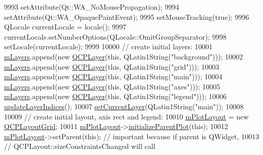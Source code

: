 \begin{DoxyCode}
9993   setAttribute(Qt::WA\_NoMousePropagation);
9994   setAttribute(Qt::WA\_OpaquePaintEvent);
9995   setMouseTracking(\textcolor{keyword}{true});
9996   QLocale currentLocale = locale();
9997   currentLocale.setNumberOptions(QLocale::OmitGroupSeparator);
9998   setLocale(currentLocale);
9999 
10000   \textcolor{comment}{// create initial layers:}
10001   \hyperlink{class_q_custom_plot_a9685e7ec1ef5e6066dd7d91bb3a698b3}{mLayers}.append(\textcolor{keyword}{new} \hyperlink{class_q_custom_plot_a5dbf96bf7664c1b6fce49063eeea6eef}{QCPLayer}(\textcolor{keyword}{this}, QLatin1String(\textcolor{stringliteral}{"background"})));
10002   \hyperlink{class_q_custom_plot_a9685e7ec1ef5e6066dd7d91bb3a698b3}{mLayers}.append(\textcolor{keyword}{new} \hyperlink{class_q_custom_plot_a5dbf96bf7664c1b6fce49063eeea6eef}{QCPLayer}(\textcolor{keyword}{this}, QLatin1String(\textcolor{stringliteral}{"grid"})));
10003   \hyperlink{class_q_custom_plot_a9685e7ec1ef5e6066dd7d91bb3a698b3}{mLayers}.append(\textcolor{keyword}{new} \hyperlink{class_q_custom_plot_a5dbf96bf7664c1b6fce49063eeea6eef}{QCPLayer}(\textcolor{keyword}{this}, QLatin1String(\textcolor{stringliteral}{"main"})));
10004   \hyperlink{class_q_custom_plot_a9685e7ec1ef5e6066dd7d91bb3a698b3}{mLayers}.append(\textcolor{keyword}{new} \hyperlink{class_q_custom_plot_a5dbf96bf7664c1b6fce49063eeea6eef}{QCPLayer}(\textcolor{keyword}{this}, QLatin1String(\textcolor{stringliteral}{"axes"})));
10005   \hyperlink{class_q_custom_plot_a9685e7ec1ef5e6066dd7d91bb3a698b3}{mLayers}.append(\textcolor{keyword}{new} \hyperlink{class_q_custom_plot_a5dbf96bf7664c1b6fce49063eeea6eef}{QCPLayer}(\textcolor{keyword}{this}, QLatin1String(\textcolor{stringliteral}{"legend"})));
10006   \hyperlink{class_q_custom_plot_a3117754df3a5638787a6223c7147970f}{updateLayerIndices}();
10007   \hyperlink{class_q_custom_plot_a73a6dc47c653bb6f8f030abca5a11852}{setCurrentLayer}(QLatin1String(\textcolor{stringliteral}{"main"}));
10008 
10009   \textcolor{comment}{// create initial layout, axis rect and legend:}
10010   \hyperlink{class_q_custom_plot_ac97298756882a0eecd98151679850ac1}{mPlotLayout} = \textcolor{keyword}{new} \hyperlink{class_q_c_p_layout_grid}{QCPLayoutGrid};
10011   \hyperlink{class_q_custom_plot_ac97298756882a0eecd98151679850ac1}{mPlotLayout}->\hyperlink{class_q_c_p_layerable_a8cbe5a0c9a5674249982f5ca5f8e02bc}{initializeParentPlot}(\textcolor{keyword}{this});
10012   \hyperlink{class_q_custom_plot_ac97298756882a0eecd98151679850ac1}{mPlotLayout}->setParent(\textcolor{keyword}{this}); \textcolor{comment}{// important because if parent is QWidget,}
10013                                 \textcolor{comment}{// QCPLayout::sizeConstraintsChanged will call}

\end{DoxyCode}
